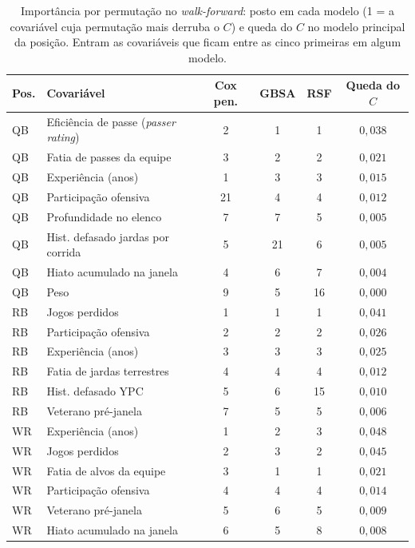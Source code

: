 \begin{table}[H]
\centering
\caption{Importância por permutação no \textit{walk-forward}: posto em cada modelo (1 = a covariável cuja permutação mais derruba o $C$) e queda do $C$ no modelo principal da posição. Entram as covariáveis que ficam entre as cinco primeiras em algum modelo.}
\label{tab:tgb_imp_inf}
\thesistablesetup
\footnotesize\setlength{\tabcolsep}{3pt}
\begin{tabular*}{\textwidth}{@{\extracolsep{\fill}}llcccc@{}}
\toprule
\textbf{Pos.} & \textbf{Covariável} & \textbf{Cox pen.} & \textbf{GBSA} & \textbf{RSF} & \textbf{Queda do $C$} \\
\midrule
QB & Eficiência de passe (\textit{passer rating}) & 2 & 1 & 1 & $0{,}038$ \\
QB & Fatia de passes da equipe & 3 & 2 & 2 & $0{,}021$ \\
QB & Experiência (anos) & 1 & 3 & 3 & $0{,}015$ \\
QB & Participação ofensiva & 21 & 4 & 4 & $0{,}012$ \\
QB & Profundidade no elenco & 7 & 7 & 5 & $0{,}005$ \\
QB & Hist. defasado jardas por corrida & 5 & 21 & 6 & $0{,}005$ \\
QB & Hiato acumulado na janela & 4 & 6 & 7 & $0{,}004$ \\
QB & Peso & 9 & 5 & 16 & $0{,}000$ \\
\midrule
RB & Jogos perdidos & 1 & 1 & 1 & $0{,}041$ \\
RB & Participação ofensiva & 2 & 2 & 2 & $0{,}026$ \\
RB & Experiência (anos) & 3 & 3 & 3 & $0{,}025$ \\
RB & Fatia de jardas terrestres & 4 & 4 & 4 & $0{,}012$ \\
RB & Hist. defasado YPC & 5 & 6 & 15 & $0{,}010$ \\
RB & Veterano pré-janela & 7 & 5 & 5 & $0{,}006$ \\
\midrule
WR & Experiência (anos) & 1 & 2 & 3 & $0{,}048$ \\
WR & Jogos perdidos & 2 & 3 & 2 & $0{,}045$ \\
WR & Fatia de alvos da equipe & 3 & 1 & 1 & $0{,}021$ \\
WR & Participação ofensiva & 4 & 4 & 4 & $0{,}014$ \\
WR & Veterano pré-janela & 5 & 6 & 5 & $0{,}009$ \\
WR & Hiato acumulado na janela & 6 & 5 & 8 & $0{,}008$ \\
\bottomrule
\end{tabular*}
\end{table}

